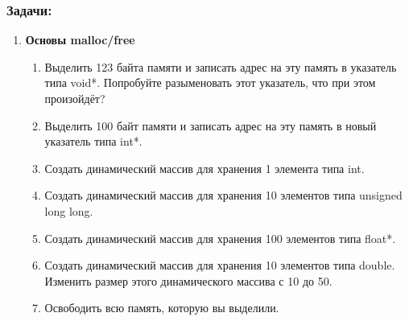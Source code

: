 \documentclass{article}
\begin{document}
\subsubsection*{Задачи:}
\begin{enumerate}
\item \textbf{Основы malloc/free}
\begin{enumerate}
\item Выделить 123 байта памяти и записать адрес на эту память в указатель типа void*. Попробуйте разыменовать этот указатель, что при этом произойдёт?
\item Выделить 100 байт памяти и записать адрес на эту память в новый указатель типа int*.
\item Создать динамический массив для хранения 1 элемента типа int.
\item Создать динамический массив для хранения 10 элементов типа unsigned long long.
\item Создать динамический массив для хранения 100 элементов типа float*.
\item Создать динамический массив для хранения 10 элементов типа double. Изменить размер этого динамического массива с 10 до 50.
\item Освободить всю память, которую вы выделили.
\end{enumerate}


\end{enumerate}


\newpage
\end{document}
